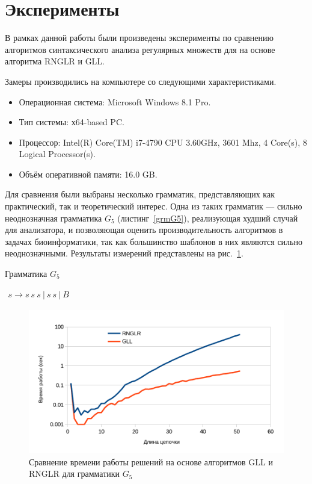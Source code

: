 \section{Эксперименты}
В рамках данной работы были произведены эксперименты по сравнению алгоритмов синтаксического анализа регулярных множеств для на основе алгоритма RNGLR и GLL. 

Замеры производились на компьютере со следующими характеристиками.
\begin{itemize}
\item Операционная система: Microsoft Windows 8.1 Pro.
\item Тип системы: х64-based PC.
\item Процессор: Intel(R) Core(TM) i7-4790 CPU 3.60GHz, 3601 Mhz, 4 Core(s), 8 Logical Processor(s).
\item Объём оперативной памяти: 16.0 GB.
\end{itemize}

Для сравнения были выбраны несколько грамматик, представляющих как практический, так и теоретический интерес. Одна из таких грамматик --- сильно неоднозначная грамматика $G_5$ (листинг~\ref{grmG5}), реализующая худший случай для анализатора, и позволяющая оценить производительность алгоритмов в задачах биоинформатики, так как большинство шаблонов в них являются сильно неоднозначными. Результаты измерений представлены на рис.~\ref{exp1}. 

\begin{listing}
\caption{Грамматика $G_5$}
\label{grmG5}
\centering
$\begin{array}{rl}
s \rightarrow s \ s \ s \ |  \ s \ s \ | \ B 
\end{array}$
\end{listing} 

\begin{figure}
 \centering
 \includegraphics[width=\textwidth]{Ragozina/pics/UmbLog.pdf}
 \caption{Сравнение времени работы решений на основе алгоритмов GLL и RNGLR для грамматики $G_5$}
 \label{exp1}
\end{figure}

